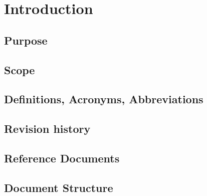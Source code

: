 \section{Introduction}

\subsection{Purpose}

\subsection{Scope}

\subsection{Definitions, Acronyms, Abbreviations}

\subsection{Revision history}

\subsection{Reference Documents}

\subsection{Document Structure}
